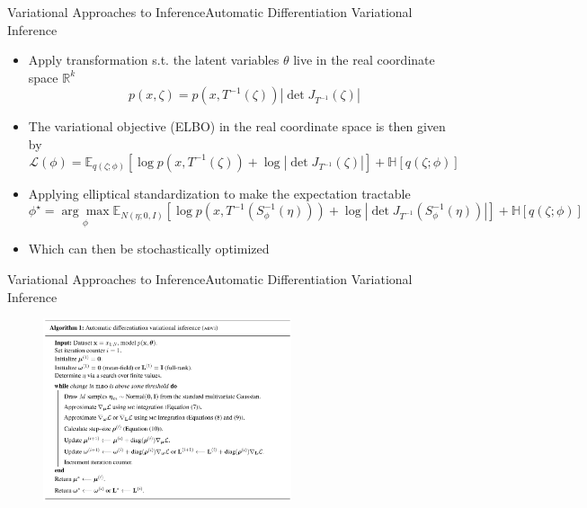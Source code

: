 \documentclass[AERbeamer%
              ,optEnglish%
              ,optBiber%
              ,optBibstyleAlphabetic%
              ,optBeamerClassicFormat%
              ]{AERlatex}%
\begin{document}
\begin{frame}[c]{Variational Approaches to Inference}{Automatic Differentiation Variational Inference}
    \centering
    \begin{itemize}
        \item Apply transformation s.t. the latent variables $\theta$ live in the real coordinate space $\mathbb{R}^{k}$
        \begin{equation*}
            p(x, \zeta) = p(x, T^{-1}(\zeta)) | \det J_{T^{-1}}(\zeta)|
        \end{equation*}
        \item The variational objective (ELBO) in the real coordinate space is then given by
        \begin{equation*}
            \mathcal{L}(\phi) = \mathbb{E}_{q(\zeta; \phi)} \left[ \log p(x, T^{-1}(\zeta)) + \log | \det J_{T^{-1}}(\zeta) | \right] + \mathbb{H}[q(\zeta; \phi)]
        \end{equation*}
        \item Applying elliptical standardization to make the expectation tractable
        \begin{equation*}
            \phi^{\star} = \underset{\phi}{\arg \max} \mathbb{E}_{N(\eta; 0, I)} \left[ \log p \left( x, T^{-1}(S^{-1}_{\phi}(\eta)) \right) + \log | \det J_{T^{-1}} \left( S^{-1}_{\phi}(\eta) \right) | \right] + \mathbb{H}[q(\zeta; \phi)]
        \end{equation*}
        \item Which can then be stochastically optimized
    \end{itemize}
\end{frame}


\begin{frame}[c]{Variational Approaches to Inference}{Automatic Differentiation Variational Inference}
    \centering
    \begin{figure}
        \centering
        \includegraphics[width=0.65\textwidth]{VIADVIAlgo.png}
    \end{figure}
\end{frame}
\end{document}
